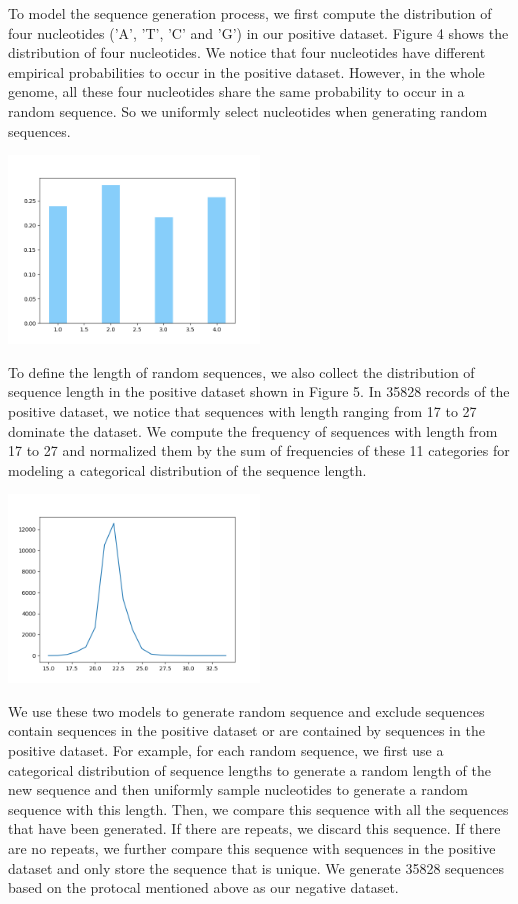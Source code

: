 \documentclass[letterpaper, 11pt]{article}
\newenvironment{Figure}
  {\par\medskip\noindent\minipage{\linewidth}}
  {\endminipage\par\medskip}
\begin{document}
\begin{multicols*}{2}
{To model the sequence generation process, we first compute the distribution of four nucleotides ('A', 'T', 'C' and 'G') in our positive dataset. Figure 4 shows the distribution of four nucleotides. We notice that four nucleotides have different empirical probabilities to occur in the positive dataset. However, in the whole genome, all these four nucleotides share the same probability to occur in a random sequence. So we uniformly select nucleotides when generating random sequences. 
\begin{Figure}
\includegraphics[height=5cm, width=\textwidth]{ATCG.png}
\end{Figure}
To define the length of random sequences, we also collect the distribution of sequence length in the positive dataset shown in Figure 5. In 35828 records of the positive dataset, we notice that sequences with length ranging from 17 to 27 dominate the dataset. We compute the frequency of sequences with length from 17 to 27 and normalized them by the sum of frequencies of these 11 categories for modeling a categorical distribution of the sequence length.
\begin{Figure}
\includegraphics[height=5cm, width=\textwidth]{lendistribute.png}
\end{Figure}
We use these two models to generate random sequence and exclude sequences contain sequences in the positive dataset or are contained by sequences in the positive dataset. For example, for each random sequence, we first use a categorical distribution of sequence lengths to generate a random length of the new sequence and then uniformly sample nucleotides to generate a random sequence with this length. Then, we compare this sequence with all the sequences that have been generated. If there are repeats, we discard this sequence. If there are no repeats, we further compare this sequence with sequences in the positive dataset and only store the sequence that is unique. We generate 35828 sequences based on the protocal mentioned above as our negative dataset.
}
\end{multicols*}
\end{document}
